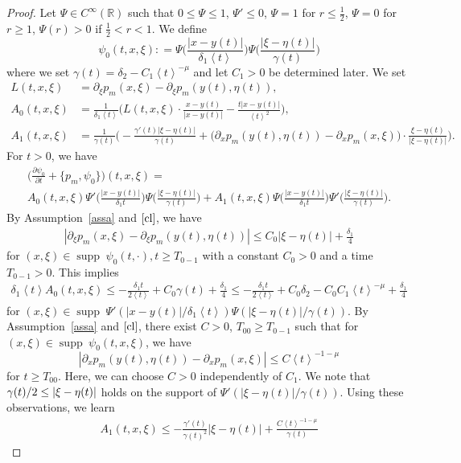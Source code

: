 \documentclass[AHL,Unicode,longabstracts,published]{cedram}
\renewcommand*\c{\gamma}
\renewcommand*\d{\delta}
\newcommand*\g{\psi}
\newcommand*\m{\mu}
\newcommand*\x{\xi}
\newcommand*\y{\eta}
\newcommand{\G}{\Psi}
\newcommand*\re{\mathbb{R}}
\newcommand*\pa{\partial}
\newcommand*\coloneqq{\mathrel{\mathop:}=}
\DeclareMathOperator{\supp}{supp\;}
\newcommand{\jap}[1]{\left\langle #1 \right\rangle}
\newcommand{\bigpare}[1]{\bigl(#1\bigr)}
\newcommand{\biggpare}[1]{\biggl(#1\biggr)}
\begin{document}
\begin{proof}
Let $\Psi \in C^{\infty}(\re)$ such that $0\leq \Psi \leq 1$, $\Psi'\leq0$, $\Psi =1$ for $r \leq \frac{1}{2}$, $\Psi =0$ for $r\geq1$, $\Psi(r)>0$ if $\frac{1}{2}<r<1$. We define
\[
\g_0(t,x,\x)\coloneqq \Psi\biggpare{\frac{|x-y(t)|}{\d_1\jap{t}}}\Psi\biggpare{\frac{|\x-\y(t)|}{\c(t)}}
\]
where we set $\c(t)=\d_2-C_1\jap{t}^{-\m}$ and let $C_1>0$ be determined later. We set
\begin{align*}
L(t,x,\x)&=\pa_{\x}p_m(x,\x)-\pa_{\x}p_m(y(t),\y(t)),\\
A_0(t,x,\x)&=\frac{1}{\d_1\jap{t}}\biggpare{L(t,x,\x)\cdot \frac{x-y(t)}{|x-y(t)|} -\frac{t|x-y(t)|}{\jap{t}^2}},\\
A_1(t,x,\x)&=\frac{1}{\c(t)}\biggpare{-\frac{\c'(t)|\x-\y(t)|}{\c(t)}+\bigpare{\pa_xp_m(y(t),\y(t))-\pa_xp_m(x,\x)}\cdot \frac{\x-\y(t)}{|\x-\y(t)|}}.
\end{align*}
For $t>0$, we have
\begin{multline}\label{Psi0}
\biggpare{\frac{\pa \g_0}{\pa t}+\{p_m, \g_0 \}}(t, x,\x)=\\
A_0(t,x,\x)\Psi'\biggpare{\frac{|x-y(t)|}{\d_1t}}\Psi\biggpare{\frac{|\x-\y(t)|}{\c(t)}}
+A_1(t,x,\x) \Psi\biggpare{\frac{|x-y(t)|}{\d_1t}}\Psi'\biggpare{\frac{|\x-\y(t)|}{\c(t)}}.
\end{multline}
By Assumption~\ref{assa} and $\eqref{cl}$, we have
\begin{align*}
\left|\pa_{\x}p_m(x,\x)-\pa_{\x}p_m(y(t),\y(t))\right|\leq C_0|\x-\y(t)|+\frac{\d_1}{4}
\end{align*}
for $(x,\x)\in \supp \g_0(t,\cdot), t\geq T_{0-1}$ with a constant $C_0>0$ and a time $T_{0-1}>0$. This implies
\begin{align}\label{A_0}
\d_1\jap{t}A_0(t,x,\x)\leq -\frac{\d_1 t}{2\jap{t}}+C_0\c(t)+\frac{\d_1}{4}\leq -\frac{\d_1 t}{2\jap{t}}+C_0\d_2-C_0C_1\jap{t}^{-\m}+\frac{\d_1}{4}
\end{align}
for $(x,\x)\in \supp \Psi'(|x-y(t)|/\d_1\jap{t})\Psi(|\x-\y(t)|/\c(t))$. By Assumption~\ref{assa} and $\eqref{cl}$, there exist $C>0$, $T_{00}\geq T_{0-1}$ such that for $(x,\x)\in \supp \g_0(t,x,\x)$, we have
\[
\left|\pa_{x}p_m(y(t),\y(t))-\pa_{x}p_m(x,\x)\right|\leq C\jap{t}^{-1-\m}
\]
for $t\geq T_{00}$. Here, we can choose $C>0$ independently of $C_1$. We note that $\c(t)/2\linebreak\leq |\x-\y(t)|$ holds on the support of $\G'(|\x-\y(t)|/\c(t))$. Using these observations, we learn
\begin{multline}\label{A_1}
A_1(t,x,\x)\leq -\frac{\c'(t)}{\c(t)^2}|\x-\y(t)|+\frac{C\jap{t}^{-1-\m}}{\c(t)} 

\end{multline}
\end{proof}
\end{document}
